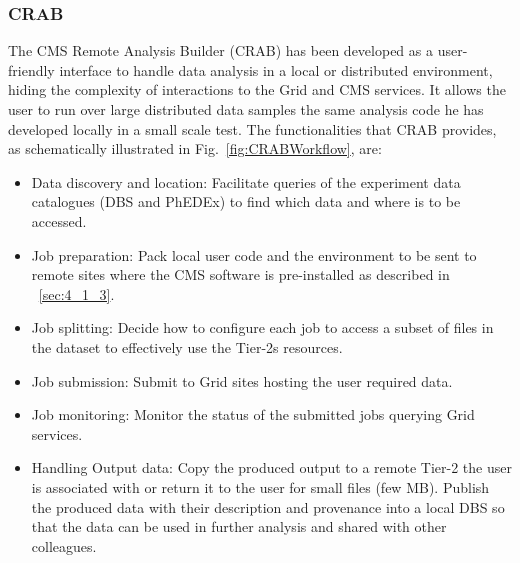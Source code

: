 \subsubsection{CRAB}
\label{sec:CRAB}
The CMS Remote Analysis Builder (CRAB)\cite{RefCRAB} has been developed as a user-friendly interface to handle data analysis in a local or distributed environment, hiding the complexity of interactions to the Grid and CMS services.
It allows the user to run over large distributed data samples the same 
analysis code he has developed locally in a small scale test. 
The functionalities that CRAB provides, as schematically illustrated in Fig.~\ref{fig:CRABWorkflow}, are:
\begin{itemize}
\item{Data discovery and location:}
Facilitate queries of the experiment data catalogues (DBS and PhEDEx) to find which data and where is to be accessed.
\item{Job preparation:}
Pack local user code and the environment to be sent to remote sites where the CMS software is pre-installed as described in ~\ref{sec:4_1_3}.
\item{Job splitting:}
Decide how to configure each job to access a subset of files in the dataset to effectively use the Tier-2s resources.
\item{Job submission:}
Submit to Grid sites hosting the user required data.
\item{Job monitoring:}
Monitor the status of the submitted jobs querying Grid services.
\item{Handling Output data:}
Copy the produced output to a remote Tier-2 the user is associated with or return it to the user for small files (few MB).
Publish the produced data with their description and provenance into a local DBS so that the data can be used in further analysis and shared with other colleagues.
\end{itemize} 

